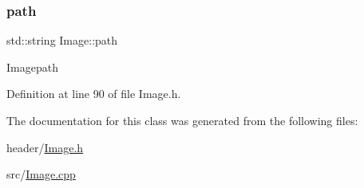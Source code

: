 \mbox{\label{classImage_aec8a33f176362d146da8c058798ebbff}} 
\subsubsection{\texorpdfstring{path}{path}}
{\footnotesize\ttfamily std\+::string Image\+::path\hspace{0.3cm}{\ttfamily [private]}}

Imagepath 

Definition at line 90 of file Image.\+h.



The documentation for this class was generated from the following files\+:\begin{DoxyCompactItemize}
\item 
header/\mbox{\hyperlink{Image_8h}{Image.\+h}}\item 
src/\mbox{\hyperlink{Image_8cpp}{Image.\+cpp}}\end{DoxyCompactItemize}
